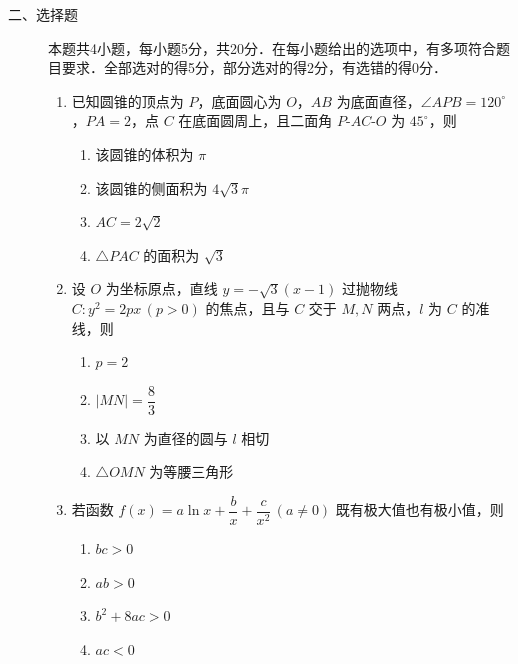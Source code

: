 \begin{description}
    \item[二、选择题] 本题共4小题，每小题5分，共20分．在每小题给出的选项中，有多项符合题目要求．全部选对的得5分，部分选对的得2分，有选错的得0分．
    \begin{enumerate}[leftmargin=5pt]
      \addtocounter{enumi}{+8}
        \item 已知圆锥的顶点为 $P$，底面圆心为 $O$，$AB$ 为底面直径，$\angle APB=120^\circ$，$PA=2$，点 $C$ 在底面圆周上，且二面角 $P$-$AC$-$O$ 为 $45^\circ$，则
        \begin{enumerate}[label=\Alph*.]
            \item 该圆锥的体积为 $\pi$
            \item 该圆锥的侧面积为 $4\sqrt{3}\pi$
            \item $AC=2\sqrt{2}$
            \item $\triangle PAC$ 的面积为 $\sqrt{3}$
        \end{enumerate}

        \item 设 $O$ 为坐标原点，直线 $y=-\sqrt{3}(x-1)$ 过抛物线 $C:y^2=2px\,(p>0)$ 的焦点，且与 $C$ 交于 $M,N$ 两点，$l$ 为 $C$ 的准线，则
        \begin{enumerate}[label=\Alph*.]
            \item $p=2$
            \item $|MN|=\dfrac{8}{3}$
            \item 以 $MN$ 为直径的圆与 $l$ 相切
            \item $\triangle OMN$ 为等腰三角形
        \end{enumerate}

        \item 若函数 $f(x)=a\ln x+\dfrac{b}{x}+\dfrac{c}{x^2}\,(a\neq0)$ 既有极大值也有极小值，则
        \begin{enumerate}[label=\Alph*.]
            \item $bc>0$
            \item $ab>0$
            \item $b^2+8ac>0$
            \item $ac<0$
        \end{enumerate}


\end{enumerate}
\end{description}
